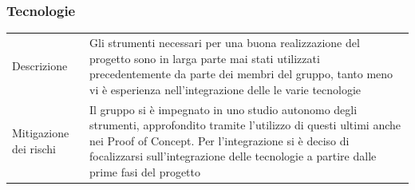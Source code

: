 \documentclass{article}
\begin{document}
\subsubsection{Tecnologie}\begin{center}
\begin{tabular}{P{10em} P{20em}} 
     Descrizione & Gli strumenti necessari per una buona realizzazione del progetto sono in larga parte mai stati utilizzati precedentemente da parte dei membri del gruppo, tanto meno vi è esperienza nell'integrazione delle le varie tecnologie\\ 
    Mitigazione dei rischi & Il gruppo si è impegnato in uno studio autonomo degli strumenti, approfondito tramite l'utilizzo di questi ultimi anche nei Proof of Concept. Per l'integrazione si è deciso di focalizzarsi sull'integrazione delle tecnologie a partire dalle prime fasi del progetto\\
\end{tabular}
\end{center}
\end{document}
